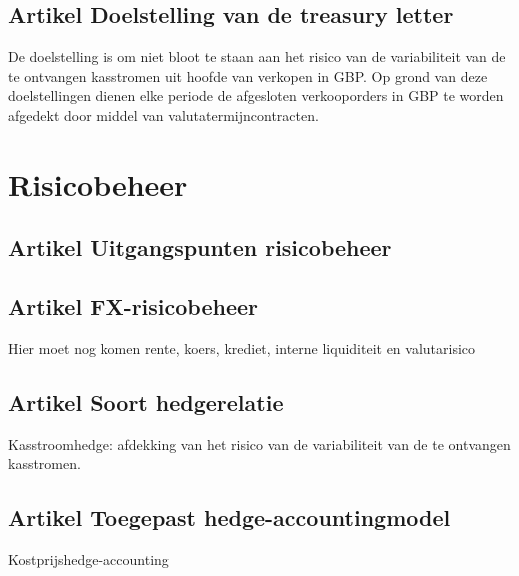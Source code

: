 \subsection*{Artikel \theartikel \hspace{1em} Doelstelling van de treasury letter}
De doelstelling is om niet bloot te staan aan het risico van de variabiliteit van de te ontvangen kasstromen uit hoofde van verkopen in GBP. Op grond van deze doelstellingen dienen elke periode de afgesloten verkooporders in GBP te worden afgedekt door middel van valutatermijncontracten.

\section*{Risicobeheer}
\subsection*{Artikel \theartikel \hspace{1em} Uitgangspunten risicobeheer}


\subsection*{Artikel \theartikel \hspace{1em} FX-risicobeheer}
{\color{red}Hier moet nog komen rente, koers, krediet, interne liquiditeit en valutarisico}



\subsection*{Artikel \theartikel \hspace{1em} Soort hedgerelatie}
Kasstroomhedge: afdekking van het risico van de variabiliteit van de te ontvangen kasstromen.


\subsection*{Artikel \theartikel \hspace{1em} Toegepast hedge-accountingmodel}
Kostprijshedge-accounting


